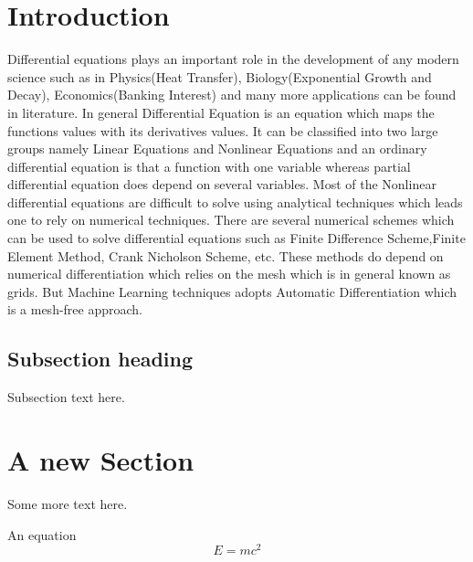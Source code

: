 \documentclass{pramana}
\begin{document}

\artcitid{\#\#\#\#}
\setcounter{page}{23}



\section{Introduction}
Differential equations plays an important role in the development of any modern science such as in Physics(Heat Transfer), Biology(Exponential Growth and Decay), Economics(Banking Interest) and many more applications can be found in literature. In general Differential Equation is an equation which maps the functions values with its derivatives values. It can be classified into two large groups namely Linear Equations and Nonlinear Equations and an ordinary differential equation is that a function with one variable whereas partial differential equation does depend on several variables. Most of the Nonlinear differential equations are difficult to solve using analytical techniques which leads one to rely on numerical techniques. There are several numerical schemes which can be used to solve differential equations such as Finite Difference Scheme,Finite Element Method, Crank Nicholson Scheme, etc. These methods do depend on numerical differentiation which relies on the mesh which is in general known as grids. But Machine Learning techniques adopts Automatic Differentiation which is a mesh-free approach.
\subsection{Subsection heading}
Subsection text here. 


\section{A new Section}
Some more  text here.  

An equation
\begin{equation}
E=mc^2
\end{equation}
\end{document}
